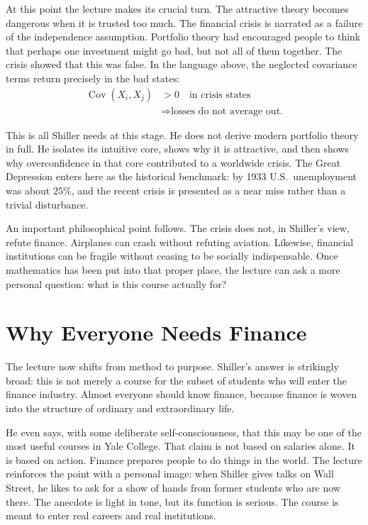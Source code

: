 At this point the lecture makes its crucial turn. The attractive theory becomes dangerous when it is trusted too much. The financial crisis is narrated as a failure of the independence assumption. Portfolio theory had encouraged people to think that perhaps one investment might go bad, but not all of them together. The crisis showed that this was false. In the language above, the neglected covariance terms return precisely in the bad states:
\begin{equation}
\begin{aligned}
\operatorname{Cov}(X_i,X_j) &>0 \quad \text{in crisis states} \\
&\Longrightarrow \text{losses do not average out.}
\end{aligned}
\end{equation}

This is all Shiller needs at this stage. He does not derive modern portfolio theory in full. He isolates its intuitive core, shows why it is attractive, and then shows why overconfidence in that core contributed to a worldwide crisis. The Great Depression enters here as the historical benchmark: by 1933 U.S.\ unemployment was about \(25\%\), and the recent crisis is presented as a near miss rather than a trivial disturbance.

An important philosophical point follows. The crisis does not, in Shiller's view, refute finance. Airplanes can crash without refuting aviation. Likewise, financial institutions can be fragile without ceasing to be socially indispensable. Once mathematics has been put into that proper place, the lecture can ask a more personal question: what is this course actually for?

\section{Why Everyone Needs Finance}

The lecture now shifts from method to purpose. Shiller's answer is strikingly broad: this is not merely a course for the subset of students who will enter the finance industry. Almost everyone should know finance, because finance is woven into the structure of ordinary and extraordinary life.

He even says, with some deliberate self-consciousness, that this may be one of the most useful courses in Yale College. That claim is not based on salaries alone. It is based on action. Finance prepares people to do things in the world. The lecture reinforces the point with a personal image: when Shiller gives talks on Wall Street, he likes to ask for a show of hands from former students who are now there. The anecdote is light in tone, but its function is serious. The course is meant to enter real careers and real institutions.

